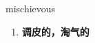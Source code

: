 
\begin{frame}
{\huge mischievous}
\begin{center}
\begin{enumerate}\Large
  \item \textbf{调皮的，淘气的}
\end{enumerate}
\end{center}
\end{frame}
